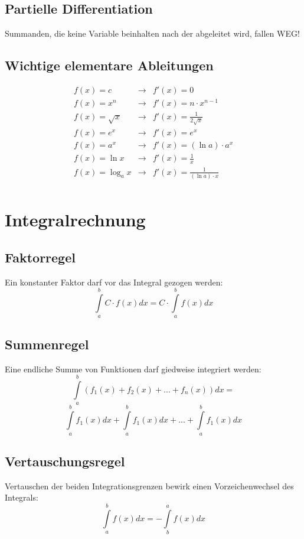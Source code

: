 \documentclass[10pt,a4paper,twocolumn]{article}
\begin{document}
\subsection{Partielle Differentiation}
Summanden, die keine Variable beinhalten nach der abgeleitet wird, fallen WEG!

\subsection{Wichtige elementare Ableitungen}
\[
\begin{array}{lll}
	f(x)=c & \rightarrow & f'(x)=0 \\
	f(x)=x^n & \rightarrow & f'(x)=n\cdot x^{n-1} \\	
	f(x)=\sqrt{x}& \rightarrow & f'(x)=\frac{1}{2\sqrt{x}} \\
	f(x)=e^x & \rightarrow & f'(x)=e^x \\
	f(x)=a^x & \rightarrow & f'(x)=(\ln a)\cdot a^x \\
	f(x)=\ln x & \rightarrow & f'(x)=\frac{1}{x} \\
	f(x)=\log_{a}x & \rightarrow & f'(x)=\frac{1}{(\ln a)\cdot x} \\
\end{array}
\]

\section{Integralrechnung}

\subsection{Faktorregel}
Ein konstanter Faktor darf vor das Integral gezogen werden:
\[
\int\limits_{a}^{b}C\cdot f(x)dx=C\cdot\int\limits_{a}^{b}f(x)dx
\]

\subsection{Summenregel}
Eine endliche Summe von Funktionen darf giedweise integriert werden:
\[
\int\limits_{a}^{b}\left(f_1(x)+f_2(x)+...+f_n(x)\right)dx=
\]
\[
\int\limits_{a}^{b}f_1(x)dx+\int\limits_{a}^{b}f_1(x)dx+...+\int\limits_{a}^{b}f_1(x)dx
\]

\subsection{Vertauschungsregel}
Vertauschen der beiden Integrationsgrenzen bewirk einen Vorzeichenwechsel des Integrals:
\[
\int\limits_{a}^{b}f(x)dx=-\int\limits_{b}^{a}f(x)dx
\]
\end{document}
